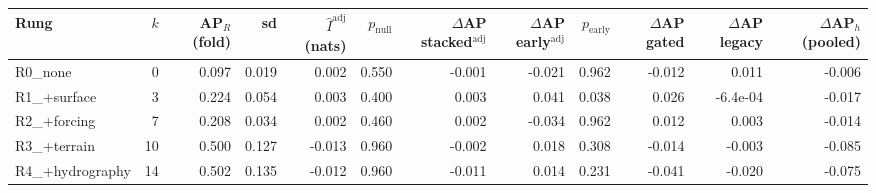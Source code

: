 \begin{tabular}{lrrrrrrrrrrr}
\toprule
Rung & $k$ & AP$_R$ (fold) & sd & $\hat I^{\mathrm{adj}}$ (nats) & $p_{\mathrm{null}}$ & $\Delta$AP stacked$^{\mathrm{adj}}$ & $\Delta$AP early$^{\mathrm{adj}}$ & $p_{\mathrm{early}}$ & $\Delta$AP gated & $\Delta$AP legacy & $\Delta$AP$_h$ (pooled) \\
\midrule
R0\_none & 0 & 0.097 & 0.019 & 0.002 & 0.550 & -0.001 & -0.021 & 0.962 & -0.012 & 0.011 & -0.006 \\
R1\_+surface & 3 & 0.224 & 0.054 & 0.003 & 0.400 & 0.003 & 0.041 & 0.038 & 0.026 & -6.4e-04 & -0.017 \\
R2\_+forcing & 7 & 0.208 & 0.034 & 0.002 & 0.460 & 0.002 & -0.034 & 0.962 & 0.012 & 0.003 & -0.014 \\
R3\_+terrain & 10 & 0.500 & 0.127 & -0.013 & 0.960 & -0.002 & 0.018 & 0.308 & -0.014 & -0.003 & -0.085 \\
R4\_+hydrography & 14 & 0.502 & 0.135 & -0.012 & 0.960 & -0.011 & 0.014 & 0.231 & -0.041 & -0.020 & -0.075 \\
\bottomrule
\end{tabular}
